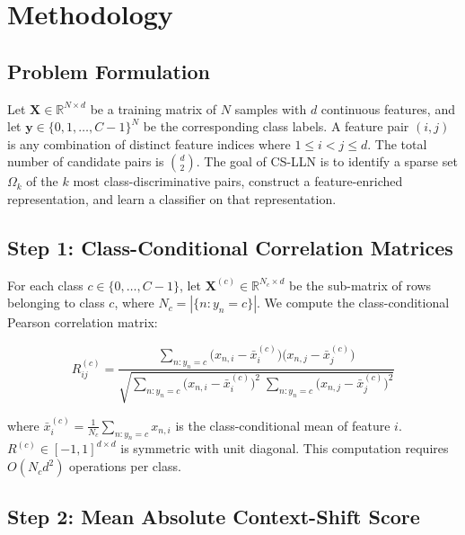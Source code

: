 \documentclass[conference]{IEEEtran}
\begin{document}
\section{Methodology}
\label{sec:method}

\subsection{Problem Formulation}

Let $\mathbf{X} \in \mathbb{R}^{N \times d}$ be a training matrix of $N$
samples with $d$ continuous features, and let
$\mathbf{y} \in \{0, 1, \ldots, C{-}1\}^N$ be the corresponding class
labels.
A feature pair $(i, j)$ is any combination of distinct feature indices where
$1 \le i < j \le d$.
The total number of candidate pairs is $\binom{d}{2}$.
The goal of CS-LLN is to identify a sparse set $\Omega_k$ of the $k$
most class-discriminative pairs, construct a feature-enriched representation,
and learn a classifier on that representation.

\subsection{Step 1: Class-Conditional Correlation Matrices}

For each class $c \in \{0, \ldots, C{-}1\}$, let
$\mathbf{X}^{(c)} \in \mathbb{R}^{N_c \times d}$ be the sub-matrix of
rows belonging to class $c$, where $N_c = |\{n : y_n = c\}|$.
We compute the class-conditional Pearson correlation matrix:

\begin{equation}
R^{(c)}_{ij}
= \frac{
    \sum_{n: y_n = c}
      \bigl(x_{n,i} - \bar{x}_i^{(c)}\bigr)
      \bigl(x_{n,j} - \bar{x}_j^{(c)}\bigr)
  }{
    \sqrt{
      \sum_{n: y_n = c} \bigl(x_{n,i} - \bar{x}_i^{(c)}\bigr)^2 \;
      \sum_{n: y_n = c} \bigl(x_{n,j} - \bar{x}_j^{(c)}\bigr)^2
    }
  }
\label{eq:classcorr}
\end{equation}

\noindent where $\bar{x}_i^{(c)} = \frac{1}{N_c} \sum_{n: y_n=c} x_{n,i}$
is the class-conditional mean of feature $i$.
$R^{(c)} \in [-1, 1]^{d \times d}$ is symmetric with unit diagonal.
This computation requires $O(N_c d^2)$ operations per class.

\subsection{Step 2: Mean Absolute Context-Shift Score}
\end{document}
